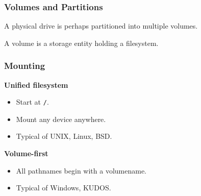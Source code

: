 \begin{frame}

\frametitle{Volumes and Partitions}

\begin{center}

A physical drive is perhaps partitioned into multiple volumes.

\end{center}

\vspace{\fill}

\begin{center}

A volume is a storage entity holding a filesystem.

\end{center}

\end{frame}


\begin{frame}

\frametitle{Mounting}

\begin{center}

\large \textbf{Unified filesystem}

\end{center}

\begin{itemize}

\item Start at \texttt{/}.

\item Mount any device anywhere.

\item Typical of UNIX, Linux, BSD.

\end{itemize}

\vspace{\fill}

\begin{center}

\large \textbf{Volume-first}

\end{center}

\begin{itemize}

\item All pathnames begin with a volumename.

\item Typical of Windows, KUDOS.

\end{itemize}

\end{frame}


